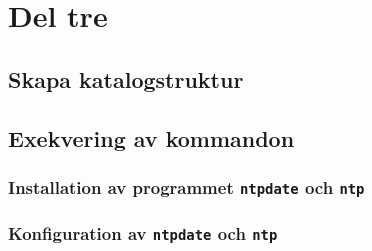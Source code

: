 %
%
%


\section{Del tre}


\subsection{Skapa katalogstruktur}


\subsection{Exekvering av kommandon}
%
%
%


\subsubsection{Installation av programmet \texttt{ntpdate} och \texttt{ntp}}

\subsubsection{Konfiguration av \texttt{ntpdate} och \texttt{ntp}}
%



